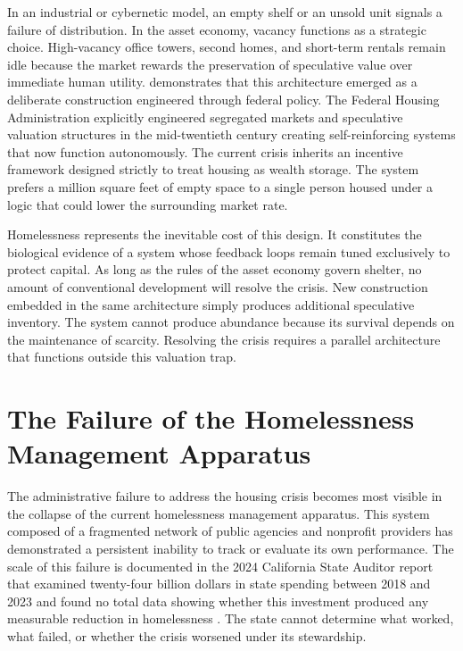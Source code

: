 \documentclass[12pt, letterpaper]{article}
\begin{document}
In an industrial or cybernetic model, an empty shelf or an unsold unit signals a failure of distribution. In the asset economy, vacancy functions as a strategic choice. High-vacancy office towers, second homes, and short-term rentals remain idle because the market rewards the preservation of speculative value over immediate human utility. \citet{rothstein_2017} demonstrates that this architecture emerged as a deliberate construction engineered through federal policy. The Federal Housing Administration explicitly engineered segregated markets and speculative valuation structures in the mid-twentieth century creating self-reinforcing systems that now function autonomously. The current crisis inherits an incentive framework designed strictly to treat housing as wealth storage. The system prefers a million square feet of empty space to a single person housed under a logic that could lower the surrounding market rate.

Homelessness represents the inevitable cost of this design. It constitutes the biological evidence of a system whose feedback loops remain tuned exclusively to protect capital. As long as the rules of the asset economy govern shelter, no amount of conventional development will resolve the crisis. New construction embedded in the same architecture simply produces additional speculative inventory. The system cannot produce abundance because its survival depends on the maintenance of scarcity. Resolving the crisis requires a parallel architecture that functions outside this valuation trap.

\section{The Failure of the Homelessness Management Apparatus}

The administrative failure to address the housing crisis becomes most visible in the collapse of the current homelessness management apparatus. This system composed of a fragmented network of public agencies and nonprofit providers has demonstrated a persistent inability to track or evaluate its own performance. The scale of this failure is documented in the 2024 California State Auditor report that examined twenty-four billion dollars in state spending between 2018 and 2023 and found no total data showing whether this investment produced any measurable reduction in homelessness \citep{ca_state_auditor_2024}. The state cannot determine what worked, what failed, or whether the crisis worsened under its stewardship.
\end{document}
